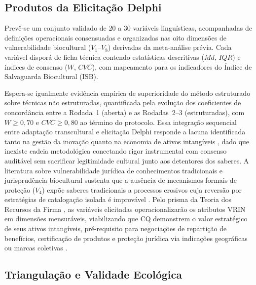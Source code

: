 \documentclass[3p,times]{elsarticle}
\begin{document}
\subsection{Produtos da Elicitação Delphi}

Prevê-se um conjunto validado de 20 a 30 variáveis linguísticas, acompanhadas de definições operacionais consensuadas e organizadas nas oito dimensões de vulnerabilidade biocultural ($V_1$--$V_8$) derivadas da meta-análise prévia. Cada variável disporá de ficha técnica contendo estatísticas descritivas ($Md$, $IQR$) e índices de consenso ($W$, $CVC$), com mapeamento para os indicadores do Índice de Salvaguarda Biocultural (ISB).

Espera-se igualmente evidência empírica de superioridade do método estruturado sobre técnicas não estruturadas, quantificada pela evolução dos coeficientes de concordância entre a Rodada~1 (aberta) e as Rodadas~2--3 (estruturadas), com $W \geq 0,70$ e $CVC \geq 0,80$ ao término do protocolo. Essa integração sequencial entre adaptação transcultural e elicitação Delphi responde a lacuna identificada tanto na gestão da inovação \citep{Tidd2005} quanto na economia de ativos intangíveis \citep{Lev2001}, dado que inexiste cadeia metodológica conectando rigor instrumental com consenso auditável sem sacrificar legitimidade cultural junto aos detentores dos saberes. A literatura sobre vulnerabilidade jurídica de conhecimentos tradicionais \citep{Dutfield2004,Cottier2004} e jurisprudência biocultural \citep{BavikatteRobinson2011,Robinson2014} sustenta que a ausência de mecanismos formais de proteção ($V_4$) expõe saberes tradicionais a processos erosivos cuja reversão por estratégias de catalogação isolada é improvável \citep{Nemoga2022}. Pelo prisma da Teoria dos Recursos da Firma \citep{Barney1991}, as variáveis elicitadas operacionalizarão os atributos VRIN em dimensões mensuráveis, viabilizando que CQ demonstrem o valor estratégico de seus ativos intangíveis, pré-requisito para negociações de repartição de benefícios, certificação de produtos e proteção jurídica via indicações geográficas ou marcas coletivas \citep{Belletti2015}.

\subsection{Triangulação e Validade Ecológica}
\end{document}
